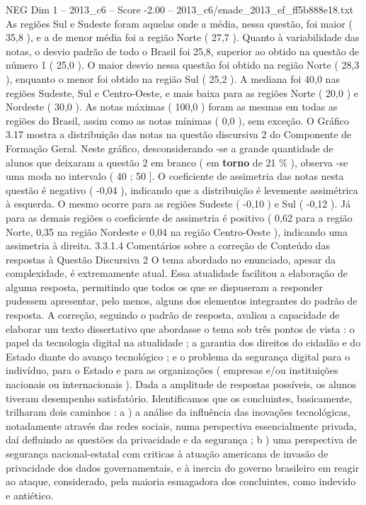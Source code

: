 \begin{textsample}{NEG Dim 1 – 2013\_c6 – Score -2.00 – 2013\_c6/enade\_2013\_ef\_ff5b888e18.txt}
As regiões Sul e Sudeste foram aquelas onde a média, nessa questão, foi maior ( 35,8 ), e a de menor média foi a região Norte ( 27,7 ).
Quanto à variabilidade das notas, o desvio padrão de todo o Brasil foi 25,8, superior ao obtido na questão de número 1 ( 25,0 ).
O maior desvio nessa questão foi obtido na região Norte ( 28,3 ), enquanto o menor foi obtido na região Sul ( 25,2 ).
A mediana foi 40,0 nas regiões Sudeste, Sul e Centro-Oeste, e mais baixa para as regiões Norte ( 20,0 ) e Nordeste ( 30,0 ).
As notas máximas ( 100,0 ) foram as mesmas em todas as regiões do Brasil, assim como as notas mínimas ( 0,0 ), sem exceção.
O Gráfico 3.17 mostra a distribuição das notas na questão discursiva 2 do Componente de Formação Geral.
Neste gráfico, desconsiderando -se a grande quantidade de alunos que deixaram a questão 2 em branco ( em \textbf{torno} de 21 \% ), observa -se uma moda no intervalo ( 40 ; 50 ].
O coeficiente de assimetria das notas nesta questão é negativo ( -0,04 ), indicando que a distribuição é levemente assimétrica à esquerda.
O mesmo ocorre para as regiões Sudeste ( -0,10 ) e Sul ( -0,12 ).
Já para as demais regiões o coeficiente de assimetria é positivo ( 0,62 para a região Norte, 0,35 na região Nordeste e 0,04 na região Centro-Oeste ), indicando uma assimetria à direita. 3.3.1.4 Comentários sobre a correção de Conteúdo das respostas à Questão Discursiva 2 O tema abordado no enunciado, apesar da complexidade, é extremamente atual.
Essa atualidade facilitou a elaboração de alguma resposta, permitindo que todos os que se dispuseram a responder pudessem apresentar, pelo menos, alguns dos elementos integrantes do padrão de resposta.
A correção, seguindo o padrão de resposta, avaliou a capacidade de elaborar um texto dissertativo que abordasse o tema sob três pontos de vista : o papel da tecnologia digital na atualidade ; a garantia dos direitos do cidadão e do Estado diante do avanço tecnológico ; e o problema da segurança digital para o indivíduo, para o Estado e para as organizações ( empresas e/ou instituições nacionais ou internacionais ).
Dada a amplitude de respostas possíveis, os alunos tiveram desempenho satisfatório.
Identificamos que os concluintes, basicamente, trilharam dois caminhos : a ) a análise da influência das inovações tecnológicas, notadamente através das redes sociais, numa perspectiva essencialmente privada, daí defluindo as questões da privacidade e da segurança ; b ) uma perspectiva de segurança nacional-estatal com criticas à atuação americana de invasão de privacidade dos dados governamentais, e à inercia do governo brasileiro em reagir ao ataque, considerado, pela maioria esmagadora dos concluintes, como indevido e antiético.

\end{textsample}
